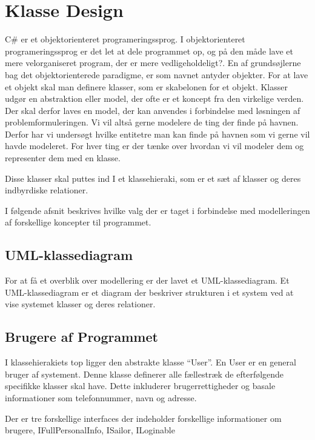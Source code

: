 \section{Klasse Design}
\label{sec:klasse_design}
C\# er et objektorienteret programeringssprog. I objektorienteret programeringssprog er det let at dele programmet op, og på den måde lave et mere velorganiseret program, der er mere vedligeholdeligt?. En af grundsøjlerne bag det objektorienterede paradigme, er som navnet antyder objekter. For at lave et objekt skal man definere klasser, som er skabelonen for et objekt. Klasser udgør en abstraktion eller model, der ofte er et koncept fra den virkelige verden. Der skal derfor laves en model, der kan anvendes i forbindelse med løsningen af problemformuleringen. Vi vil altså gerne modelere de ting der finde på havnen. Derfor har vi undersøgt hvilke entitetre man kan finde på havnen som vi gerne vil havde modeleret. For hver ting er der tænke over hvordan vi vil modeler dem og representer dem med en klasse.

Disse klasser skal puttes ind I et klassehieraki, som er et sæt af klasser og deres indbyrdiske relationer.

I følgende afsnit beskrives hvilke valg der er taget i forbindelse med modelleringen af forskellige koncepter til programmet. 

\subsection{UML-klassediagram}
For at få et overblik over modellering er der lavet et UML-klassediagram. Et UML-klassediagram er et diagram der beskriver strukturen i et system ved at vise systemet klasser og deres relationer.


\subsection{Brugere af Programmet}
\label{sub:brugere_af_programmet}

I klassehierakiets top ligger den abstrakte klasse \enquote{User}. En User er en general bruger af systement. Denne klasse definerer alle fællestræk de efterfølgende specifikke klasser skal have. Dette inkluderer brugerrettigheder og basale informationer som telefonnummer, navn og adresse.

Der er tre forskellige interfaces der indeholder forskellige informationer om brugere, IFullPersonalInfo, ISailor, ILoginable

